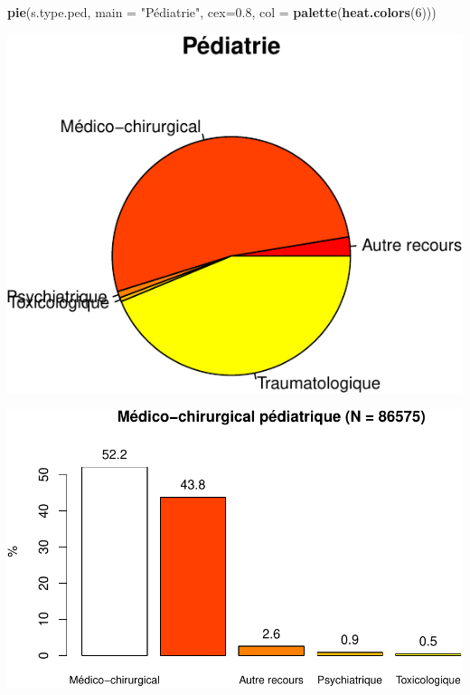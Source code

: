 \documentclass[]{article}
\newenvironment{Shaded}{\begin{snugshade}}{\end{snugshade}}
\newcommand{\KeywordTok}[1]{\textcolor[rgb]{0.13,0.29,0.53}{\textbf{{#1}}}}
\newcommand{\DataTypeTok}[1]{\textcolor[rgb]{0.13,0.29,0.53}{{#1}}}
\newcommand{\DecValTok}[1]{\textcolor[rgb]{0.00,0.00,0.81}{{#1}}}
\newcommand{\FloatTok}[1]{\textcolor[rgb]{0.00,0.00,0.81}{{#1}}}
\newcommand{\StringTok}[1]{\textcolor[rgb]{0.31,0.60,0.02}{{#1}}}
\newcommand{\OtherTok}[1]{\textcolor[rgb]{0.56,0.35,0.01}{{#1}}}
\newcommand{\NormalTok}[1]{{#1}}
\begin{document}
\begin{Shaded}
\begin{Highlighting}[]
\KeywordTok{pie}\NormalTok{(s.type.ped, }\DataTypeTok{main =} \StringTok{"Pédiatrie"}\NormalTok{, }\DataTypeTok{cex=}\FloatTok{0.8}\NormalTok{, }\DataTypeTok{col =} \KeywordTok{palette}\NormalTok{(}\KeywordTok{heat.colors}\NormalTok{(}\DecValTok{6}\NormalTok{)))}
\end{Highlighting}
\end{Shaded}

\includegraphics{analyse_merge_files/figure-latex/ped-1.pdf}

\begin{Shaded}
\end{Shaded}

\includegraphics{analyse_merge_files/figure-latex/ped-2.pdf}
\end{document}
